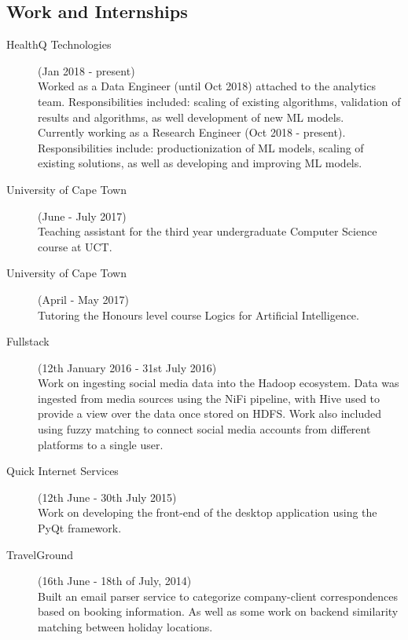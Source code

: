 \documentclass[margin,line,a4paper]{resume}
\begin{document}
\begin{resume}
        \section{\mysidestyle Work and Internships}
            \begin{description}
            	\item[HealthQ Technologies] (Jan 2018 - present) \\
                    Worked as a Data Engineer (until Oct 2018) attached to the analytics team. Responsibilities included: scaling of existing algorithms, validation of results and algorithms, as well development of new ML models. \\
                    Currently working as a Research Engineer (Oct 2018 - present). Responsibilities include: productionization of ML models, scaling of existing solutions, as well as developing and improving ML models.

            	\item[University of Cape Town] (June - July 2017) \\
            		Teaching assistant for the third year undergraduate Computer Science course at UCT.

            	\item[University of Cape Town] (April - May 2017) \\
            		Tutoring the Honours level course Logics for Artificial Intelligence.

                \item[Fullstack] (12th January 2016 - 31st July 2016) \\
                    Work on ingesting social media data into the Hadoop ecosystem. Data was ingested from media sources using the NiFi pipeline, with Hive used to provide a view over the data once stored on HDFS. Work also included using fuzzy matching to connect social media accounts from different platforms to a single user.

                \item[Quick Internet Services] (12th June - 30th July 2015) \\
                    Work on developing the front-end of the desktop application using the PyQt framework.

                \item[TravelGround] (16th June - 18th of July, 2014) \\
                    Built an email parser service to categorize company-client correspondences based on booking information. As well as some work on backend similarity matching between holiday locations.


\end{description}
\end{resume}
\end{document}

